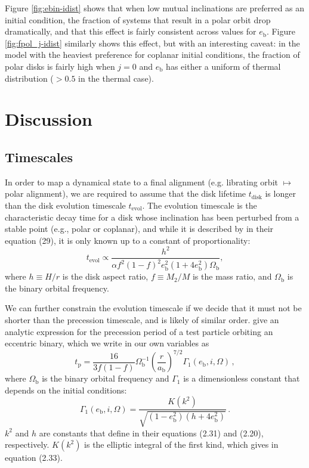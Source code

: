 \documentclass[twocolumn,linenumbers]{aastex631}
\begin{document}
Figure \ref{fig:ebin-idist} shows that when low mutual inclinations are preferred as an initial condition, the fraction of systems that result in a polar orbit drop dramatically, and that this effect is fairly consistent across values for $e_\text{b}$. Figure \ref{fig:fpol_j-idist} similarly shows this effect, but with an interesting caveat: in the model with the heaviest preference for coplanar initial conditions, the fraction of polar disks is fairly high when $j=0$ and $e_\text{b}$ has either a uniform of thermal distribution ($>0.5$ in the thermal case).

\section{Discussion}
\label{sec:discussion}

\subsection{Timescales}
In order to map a dynamical state to a final alignment (e.g. librating orbit $\mapsto$ polar alignment), we are required to assume that the disk lifetime $t_\text{disk}$ is longer than the disk evolution timescale $t_\text{evol}$. The evolution timescale is the characteristic decay time for a disk whose inclination has been perturbed from a stable point (e.g., polar or coplanar), and while it is described by \citet{lubow2018} in their equation (29), it is only known up to a constant of proportionality:
\begin{equation}
    \label{eq:tevol}
    t_\text{evol} \propto \frac{h^2}{\alpha f^2(1-f)^2 e_\text{b}^2(1+4e_\text{b}^2) \Omega_\text{b}} ,
\end{equation}
where $h\equiv H/r$ is the disk aspect ratio, $f\equiv M_2/M$ is the mass ratio, and $\Omega_\text{b}$ is the binary orbital frequency. 

We can further constrain the evolution timescale if we decide that it must not be shorter than the precession timescale, and is likely of similar order. \citet[see eq. (2.32)]{farago2010} give an analytic expression for the precession period of a test particle orbiting an eccentric binary, which we write in our own variables as
\begin{equation}
    t_\text{p} = \frac{16}{3f(1-f)} \Omega_\text{b}^{-1} \left(\frac{r}{a_\text{b}}\right)^{7/2} \Gamma_1(e_\text{b},i,\Omega)\, ,
\end{equation}
where $\Omega_\text{b}$ is the binary orbital frequency and $\Gamma_1$ is a dimensionless constant that depends on the initial conditions:
\begin{equation}
    \Gamma_1(e_\text{b},i,\Omega) = \frac{K(k^2)}{\sqrt{(1-e_\text{b}^2)(h+4e_\text{b}^2)}} \, .
\end{equation}
$k^2$ and $h$ are constants that \citet{farago2010} define in their equations (2.31) and (2.20), respectively. $K(k^2)$ is the elliptic integral of the first kind, which \citet{farago2010} gives in equation (2.33).
\end{document}
